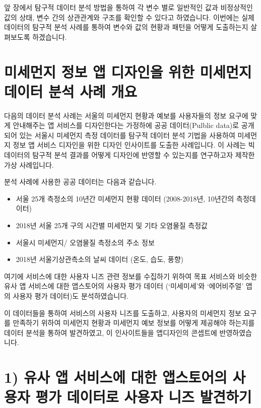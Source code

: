 \documentclass[
  letterpaper,
]{book}
\providecommand{\tightlist}{%
  \setlength{\itemsep}{0pt}\setlength{\parskip}{0pt}}\usepackage{longtable,booktabs,array}
\begin{document}
앞 장에서 탐구적 데이터 분석 방법을 통하여 각 변수 별로 일반적인 값과
비정상적인 값의 상태, 변수 간의 상관관계와 구조를 확인할 수 있다고
하였습니다. 이번에는 실제 데이터의 탐구적 분석 사례를 통하여 변수와 값의
현황과 패턴을 어떻게 도출하는지 살펴보도록 하겠습니다.

\section{미세먼지 정보 앱 디자인을 위한 미세먼지 데이터 분석 사례
개요}\label{uxbbf8uxc138uxba3cuxc9c0-uxc815uxbcf4-uxc571-uxb514uxc790uxc778uxc744-uxc704uxd55c-uxbbf8uxc138uxba3cuxc9c0-uxb370uxc774uxd130-uxbd84uxc11d-uxc0acuxb840-uxac1cuxc694}

다음의 데이터 분석 사례는 서울의 미세먼지 현황과 예보를 사용자들의 정보
요구에 맞게 안내해주는 앱 서비스를 디자인한다는 가정하에 공공
데이터(Pulblic data)로 공개되어 있는 서울시 미세먼지 측정 데이터를
탐구적 데이터 분석 기법을 사용하여 미세먼지 정보 앱 서비스 디자인을 위한
디자인 인사이트를 도출한 사례입니다. 이 사례는 빅데이터의 탐구적 분석
결과를 어떻게 디자인에 반영할 수 있는지를 연구하고자 제작한 가상
사례입니다.

분석 사례에 사용한 공공 데이터는 다음과 같습니다.

\begin{itemize}
\tightlist
\item
  서울 25개 측정소의 10년간 미세먼지 현황 데이터 (2008-2018년, 10년간의
  측정데이터)
\item
  2018년 서울 25개 구의 시간별 미세먼지 및 기타 오염물질 측정값
\item
  서울시 미세먼지/ 오염물질 측정소의 주소 정보
\item
  2018년 서울기상관측소의 날씨 데이터 (온도, 습도, 풍향)
\end{itemize}

여기에 서비스에 대한 사용자 니즈 관련 정보를 수집하기 위하여 목표
서비스와 비슷한 유사 앱 서비스에 대한 앱스토어의 사용자 평가 데이터
(`미세미세'와 `에어비주얼' 앱의 사용자 평가 데이터)도 분석하였습니다.

이 데이터들을 통하여 서비스의 사용자 니즈를 도출하고, 사용자의 미세먼지
정보 요구를 만족하기 위하여 미세먼지 현황과 미세먼지 예보 정보를 어떻게
제공해야 하는지를 데이터 분석을 통하여 발견하였고, 이 인사이트들을
앱디자인의 콘셉트에 반영하였습니다.

\section{1) 유사 앱 서비스에 대한 앱스토어의 사용자 평가 데이터로 사용자
니즈
발견하기}\label{uxc720uxc0ac-uxc571-uxc11cuxbe44uxc2a4uxc5d0-uxb300uxd55c-uxc571uxc2a4uxd1a0uxc5b4uxc758-uxc0acuxc6a9uxc790-uxd3c9uxac00-uxb370uxc774uxd130uxb85c-uxc0acuxc6a9uxc790-uxb2c8uxc988-uxbc1cuxacacuxd558uxae30}
\end{document}
